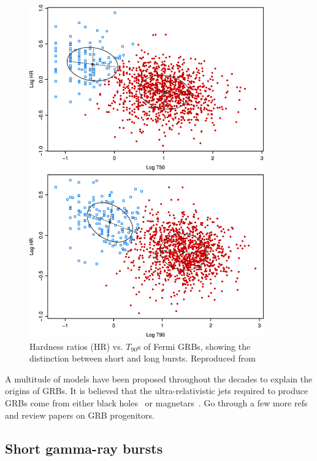 \begin{figure}[htb]
	\includegraphics[trim={0 0 0 6cm}, clip, width=0.9\textwidth]{figures/gw/grb-classification.jpg}
	\caption{Hardness ratios (HR) vs. $T_{90}$s of Fermi GRBs, showing the distinction between short and long bursts. Reproduced from~\protect\citet{fermi_2016}}
	\label{fig:grb-classification}
\end{figure}

A multitude of models have been proposed throughout the decades to explain the origins of \acp{GRB}.
It is believed that the ultra-relativistic jets required to produce \acp{GRB} come from either black holes~\citep{Woosley_1993} or magnetars~\citep{Dai_1998}.
{\color{red}Go through a few more refs and review papers on GRB progenitors.}


\subsection{Short gamma-ray bursts}

